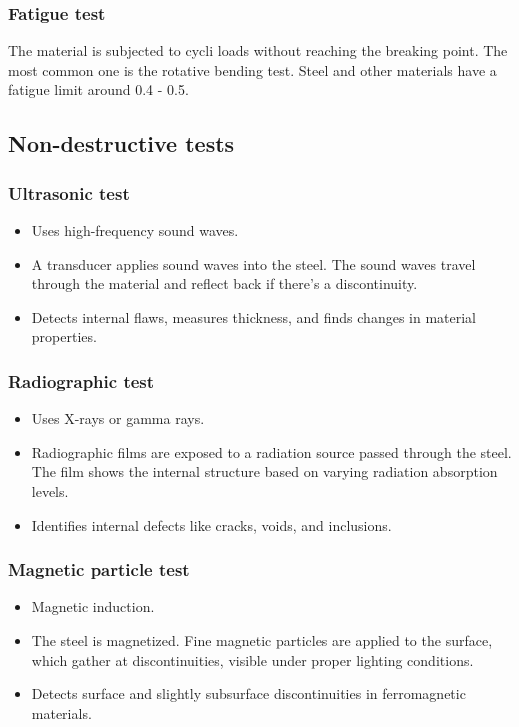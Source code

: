 \documentclass{article}
\begin{document}
\subsubsection*{Fatigue test}

The material is subjected to cycli loads without reaching the breaking point.
The most common one is the rotative bending test.
Steel and other materials have a fatigue limit around 0.4 - 0.5.

\subsection*{Non-destructive tests}

\subsubsection*{Ultrasonic test}

\begin{itemize}
    \item Uses high-frequency sound waves.
    \item A transducer applies sound waves into the steel. The sound waves
    travel through the material and reflect back if there's a discontinuity.
    \item Detects internal flaws, measures thickness, and finds changes in
    material properties.
\end{itemize}

\subsubsection*{Radiographic test}

\begin{itemize}
    \item Uses X-rays or gamma rays.
    \item Radiographic films are exposed to a radiation source passed through
    the steel. The film shows the internal structure based on varying radiation
    absorption levels.
    \item Identifies internal defects like cracks, voids, and inclusions.
\end{itemize}

\subsubsection*{Magnetic particle test}

\begin{itemize}
    \item Magnetic induction.
    \item The steel is magnetized. Fine magnetic particles are applied to the
    surface, which gather at discontinuities, visible under proper lighting
    conditions.
    \item Detects surface and slightly subsurface discontinuities in
    ferromagnetic materials.
\end{itemize}
\end{document}
